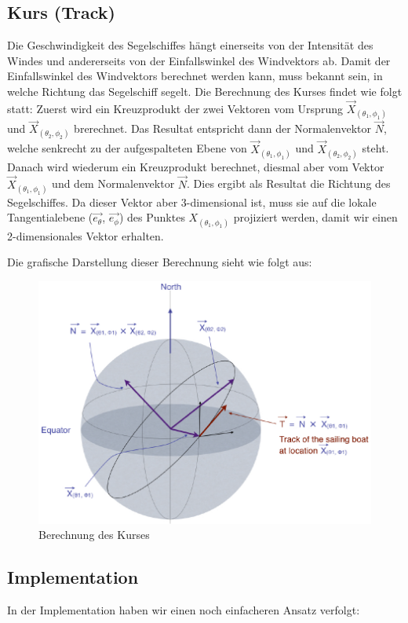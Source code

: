 \subsection{Kurs (Track)}
Die Geschwindigkeit des Segelschiffes hängt einerseits von der Intensität des
Windes und andererseits von der Einfallswinkel des Windvektors ab. Damit der
Einfallswinkel des Windvektors berechnet werden kann, muss bekannt sein, in
welche Richtung das Segelschiff segelt. Die Berechnung des Kurses findet wie
folgt statt: Zuerst wird ein Kreuzprodukt der zwei Vektoren vom Ursprung
\(\overrightarrow{X}_{(\theta_{1},\phi_{1})}\) und
\(\overrightarrow{X}_{(\theta_{2},\phi_{2})}\) brerechnet. Das Resultat
entspricht dann der Normalenvektor \(\overrightarrow{N}\), welche senkrecht zu
der aufgespalteten Ebene von \(\overrightarrow{X}_{(\theta_{1},\phi_{1})}\)
und \(\overrightarrow{X}_{(\theta_{2},\phi_{2})}\) steht. Danach wird wiederum
ein Kreuzprodukt berechnet, diesmal aber vom Vektor
\(\overrightarrow{X}_{(\theta_{1},\phi_{1})}\) und dem Normalenvektor
\(\overrightarrow{N}\).  Dies ergibt als Resultat die Richtung des
Segelschiffes. Da dieser Vektor aber 3-dimensional ist, muss sie auf die
lokale Tangentialebene (\(\overrightarrow{e_{\theta}}\),
\(\overrightarrow{e_{\phi}}\)) des Punktes $X_{(\theta_{1},\phi_{1})}$
projiziert werden, damit wir einen 2-dimensionales Vektor erhalten.

Die grafische Darstellung dieser Berechnung sieht wie folgt aus:
\begin{figure}[h!]
\centering
\includegraphics[width=0.8\linewidth]{img/track}
\caption{Berechnung des Kurses}
\label{gridnetConn}
\end{figure}

\subsection{Implementation}
\label{implSegelgeschwindigkeit}
In der Implementation haben wir einen noch einfacheren Ansatz verfolgt:

